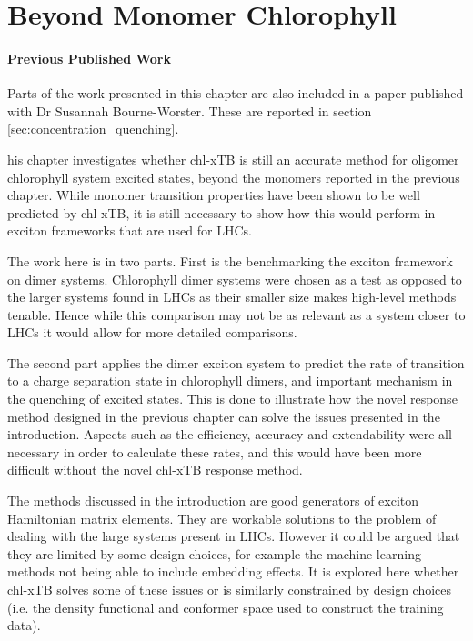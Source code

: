 %
%
\let\textcircled=\pgftextcircled
\chapter{Beyond Monomer Chlorophyll}
\label{chap:excitons}

\subsubsection*{Previous Published Work}
Parts of the work presented in this chapter are also included in a paper published 
with Dr Susannah Bourne-Worster. These are reported in section \ref{sec:concentration_quenching}.


his chapter investigates whether chl-xTB is still an accurate method 
for oligomer chlorophyll system excited states, beyond the monomers reported in 
the previous chapter. While monomer transition properties have been shown to be 
well predicted by chl-xTB, it is still necessary to show how this would perform
in exciton frameworks that are used for LHCs.

The work here is in two parts. First is the benchmarking the exciton framework on
dimer systems. Chlorophyll dimer systems were chosen as a test as opposed to the
larger systems found in LHCs as their smaller size makes high-level methods tenable.
Hence while this comparison may not be as relevant as a system closer to LHCs it 
would allow for more detailed comparisons. 

The second part applies the dimer exciton system to predict the rate of transition 
to a charge separation state in chlorophyll dimers, and important mechanism in the
quenching of excited states. This is done to illustrate how the novel response method
designed in the previous chapter can solve the issues presented in the introduction.
Aspects such as the efficiency, accuracy and extendability were all necessary in
order to calculate these rates, and this would have been more difficult without 
the novel chl-xTB response method.

The methods discussed in the introduction are good generators of exciton Hamiltonian
matrix elements. They are workable solutions to the problem of dealing with the
large systems present in LHCs. However it could be argued that they are limited
by some design choices, for example the machine-learning methods not being able
to include embedding effects. It is explored here whether chl-xTB solves some of
these issues or is similarly constrained by design choices (i.e. the density functional 
and conformer space used to construct the training data).

